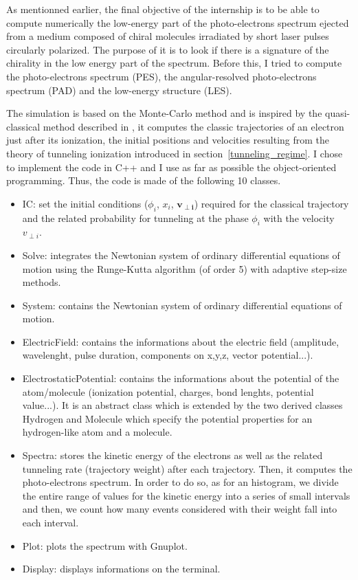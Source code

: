 \documentclass[a4paper]{article}
\begin{document}
As mentionned earlier, the final objective of the internship is to be able to compute numerically the low-energy part of the photo-electrons spectrum ejected from a medium composed of chiral molecules irradiated by short laser pulses circularly polarized. The purpose of it is to look if there is a signature of the chirality in the low energy part of the spectrum. Before this, I tried to compute the photo-electrons spectrum (PES), the angular-resolved photo-electrons spectrum (PAD) and the low-energy structure (LES). 
\par
The simulation is based on the Monte-Carlo method and is inspired by the quasi-classical method described in \cite{Hu_1997}, it computes the classic trajectories of an electron just after its ionization, the initial positions and velocities resulting from the theory of tunneling ionization introduced in section~\ref{tunneling_regime}.  I chose to implement the code in C++ and I use as far as possible the object-oriented programming. Thus, the code is made of the following 10 classes.
\begin{itemize}
\item
IC: set the initial conditions ($\phi_{i}$, $x_{i}$, $\mathbf{v_{\perp i}}$) required for the classical trajectory and the related probability for tunneling at the phase $\phi_{i}$ with the velocity $v_{\perp i}$.
\item
Solve: integrates the Newtonian system of ordinary differential equations of motion using the Runge-Kutta algorithm (of order 5) with adaptive step-size methods.
\item
System: contains the Newtonian system of ordinary differential equations of motion.
\item
ElectricField: contains the informations about the electric field (amplitude, wavelenght, pulse duration, components on x,y,z, vector potential...).
\item
ElectrostaticPotential: contains the informations about the potential of the atom/molecule (ionization potential, charges, bond lenghts, potential value...). It is an abstract class which is extended by the two derived classes Hydrogen and Molecule which specify the potential properties for an hydrogen-like atom and a molecule. 
\item
Spectra: stores the kinetic energy of the electrons as well as the related tunneling rate (trajectory weight) after each trajectory. Then, it computes the photo-electrons spectrum. In order to do so, as for an histogram, we divide the entire range of values for the kinetic energy into a series of small intervals and then, we count how many events considered with their weight fall into each interval.
\item
Plot: plots the spectrum with Gnuplot.
\item
Display: displays informations on the terminal. 
\end{itemize}
\end{document}
